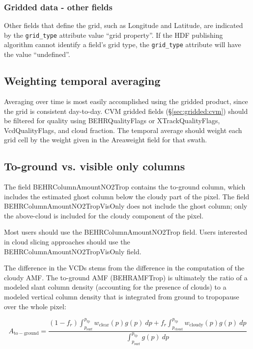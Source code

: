 \documentclass[12pt]{article}
\begin{document}
	\subsubsection{Gridded data - other fields}
	Other fields that define the grid, such as Longitude and Latitude, are indicated by the \lstinline$grid_type$ attribute value ``grid property''. If the HDF publishing algorithm cannot identify a field's grid type, the \lstinline$grid_type$ attribute will have the value ``undefined''.
	
	\subsection{Weighting temporal averaging}\label{sec:temporal-averaging}
	Averaging over time is most easily accomplished using the gridded product, since the grid is consistent day-to-day. CVM gridded fields (\S\ref{sec:gridded:cvm}) should be filtered for quality using BEHRQualityFlags or XTrackQualityFlags, VcdQualityFlags, and cloud fraction. The temporal average should weight each grid cell by the weight given in the Areaweight field for that swath.
	
	
	\subsection{To-ground vs. visible only columns}
	The field BEHRColumnAmountNO2Trop contains the to-ground column, which includes the estimated ghost column below the cloudy part of the pixel. The field BEHRColumnAmountNO2TropVisOnly does not include the ghost column; only the above-cloud  is included for the cloudy component of the pixel.
	
	Most users should use the BEHRColumnAmountNO2Trop field. Users interested in cloud slicing approaches should use the BEHRColumnAmountNO2TropVisOnly field. 
	
	The difference in the VCDs stems from the difference in the computation of the cloudy AMF. The to-ground AMF (BEHRAMFTrop) is ultimately the ratio of a modeled slant column density (accounting for the presence of clouds) to a modeled vertical column density that is integrated from ground to tropopause over the whole pixel:
	
	\begin{equation}\label{eqn:total-amf}
	A_{\mathrm{to-ground}} = \frac{(1-f_r) \int_{p_{\mathrm{surf}}}^{p_{\mathrm{tp}}} w_{\mathrm{clear}}(p) g(p) \: dp + f_r \int_{p_{\mathrm{cloud}}}^{p_{\mathrm{tp}}} w_{\mathrm{cloudy}}(p) g(p) \: dp}{\int_{p_{\mathrm{surf}}}^{p_\mathrm{tp}} g(p) \: dp}
	\end{equation}
	
\end{document}
